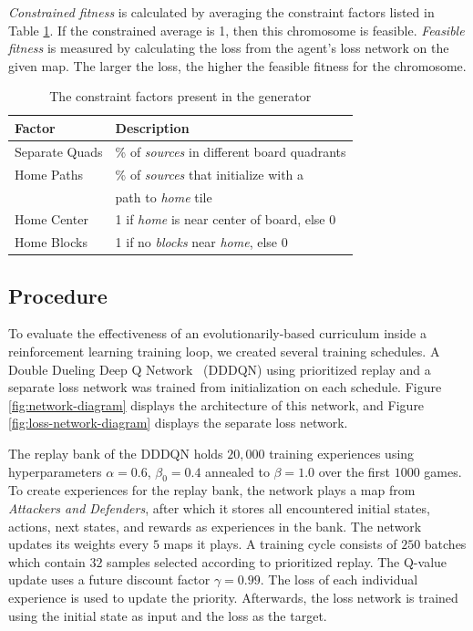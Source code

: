 \documentclass[letterpaper]{article} %
\begin{document}
\emph{Constrained fitness} is calculated by averaging the constraint factors listed in Table \ref{table:constraint-factors}. If the constrained average is 1, then this chromosome is feasible.
\emph{Feasible fitness} is measured by calculating the loss from the agent's loss network on the given map. The larger the loss, the higher the feasible fitness for the chromosome.

\begin{table}[tpb]
\begin{tabular}{|l|l|}
\hline
\textbf{Factor} & \textbf{Description}                                       \\ \hline
Separate Quads  & \% of \textit{sources} in different board quadrants               \\ \hline
Home Paths      & \% of \textit{sources} that initialize with a\\ & path to \textit{home} tile          \\ \hline
Home Center     & 1 if \textit{home} is near center of board, else 0                  \\ \hline
Home Blocks     & 1 if no \textit{blocks} near \textit{home}, else 0 \\ \hline
\end{tabular}
\caption{The constraint factors present in the generator}
\label{table:constraint-factors}
\end{table}

\subsection{Procedure}\label{sec:case-procedure}
To evaluate the effectiveness of an evolutionarily-based curriculum inside a reinforcement learning training loop, we created several training schedules. A Double Dueling Deep Q Network~\cite{wang2016dueling} (DDDQN) using prioritized replay and a separate loss network was trained from initialization on each schedule. Figure \ref{fig:network-diagram} displays the architecture of this network, and Figure \ref{fig:loss-network-diagram} displays the separate loss network.

The replay bank of the DDDQN holds $20,000$ training experiences using hyperparameters $\alpha=0.6$, $\beta_{0}=0.4$ annealed to $\beta=1.0$ over the first $1000$ games. To create experiences for the replay bank, the network plays a map from \emph{Attackers and Defenders}, after which it stores all encountered initial states, actions, next states, and rewards as experiences in the bank. The network updates its weights every $5$ maps it plays. A training cycle consists of $250$ batches which contain $32$ samples selected according to prioritized replay. The Q-value update uses a future discount factor $\gamma=0.99$. The loss of each individual experience is used to update the priority. Afterwards, the loss network is trained using the initial state as input and the loss as the target.
\end{document}
